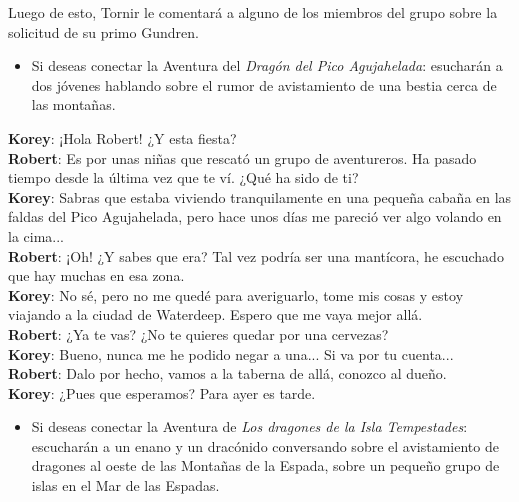 \documentclass[10pt,twoside,twocolumn,openany]{dndbook}
\begin{document}
Luego de esto, Tornir le comentará a alguno de los miembros del grupo sobre la solicitud de 
su primo Gundren.

\begin{itemize}
  \item Si deseas conectar la Aventura del \emph{Dragón del Pico Agujahelada}: esucharán a dos 
  jóvenes hablando sobre el rumor de avistamiento de una bestia cerca de las montañas.
\end{itemize} 

\begin{DndReadAloud}
  \textbf{Korey}: ¡Hola Robert! ¿Y esta fiesta? \\
  \textbf{Robert}: Es por unas niñas que rescató un grupo de aventureros. Ha pasado tiempo 
  desde la última vez que te ví. ¿Qué ha sido de ti? \\
  \textbf{Korey}: Sabras que estaba viviendo tranquilamente en una pequeña cabaña en las faldas
  del Pico Agujahelada, pero hace unos días me pareció ver algo volando en la cima... \\
  \textbf{Robert}: ¡Oh! ¿Y sabes que era? Tal vez podría ser una mantícora, he escuchado que 
  hay muchas en esa zona. \\
  \textbf{Korey}: No sé, pero no me quedé para averiguarlo, tome mis cosas y estoy viajando a la 
  ciudad de Waterdeep. Espero que me vaya mejor allá. \\
  \textbf{Robert}: ¿Ya te vas? ¿No te quieres quedar por una cervezas? \\
  \textbf{Korey}: Bueno, nunca me he podido negar a una... Si va por tu cuenta... \\
  \textbf{Robert}: Dalo por hecho, vamos a la taberna de allá, conozco al dueño. \\
  \textbf{Korey}: ¿Pues que esperamos? Para ayer es tarde.
\end{DndReadAloud}

\begin{itemize}
  \item Si deseas conectar la Aventura de \emph{Los dragones de la Isla Tempestades}: escucharán 
  a un enano y un dracónido conversando sobre el avistamiento de dragones al oeste de las Montañas 
  de la Espada, sobre un pequeño grupo de islas en el Mar de las Espadas. 
\end{itemize} 
\end{document}
